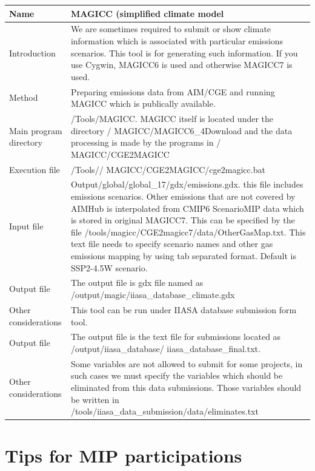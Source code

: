 \documentclass[10pt,a4paper,titlepage,dvipdfmx]{book}
\begin{document}
\begin{itemize}
\begin{tabularx}{\textwidth}{|
p{}|
p{}|} \caption{\label{tab:ReaExaMAGIC}readme example for MAGICC}\\
\hline 
Name & MAGICC (simplified climate model \\\hline 
Introduction & We are sometimes required to submit or show climate information which is associated with particular emissions scenarios. This tool is for generating such information. If you use Cygwin, MAGICC6 is used and otherwise MAGICC7 is used. \\\hline 
Method & Preparing emissions data from AIM/CGE and running MAGICC which is publically available. \\\hline 
Main program directory & /Tools/MAGICC. MAGICC itself is located under the directory / MAGICC/MAGICC6\_4Download and the data processing is made by the programs in / MAGICC/CGE2MAGICC \\\hline 
Execution file & /Tools// MAGICC/CGE2MAGICC/cge2magicc.bat \\\hline 
Input file & Output/global/global\_17/gdx/emissions.gdx. this file includes emissions scenarios. Other emissions that are not covered by AIMHub is interpolated from CMIP6 ScenarioMIP data which is stored in original MAGICC7.
This can be specified by the file /tools/magicc/CGE2magicc7/data/OtherGasMap.txt. This text file needs to specify scenario names and other gas emissions mapping by using tab separated format. 
Default is SSP2-4.5W scenario.\\\hline 
Output file & The output file is gdx file named as /output/magic/iiasa\_database\_climate.gdx \\\hline 
Other considerations & This tool can be run under IIASA database submission form tool. \\\hline 
Output file & The output file is the text file for submissions located as /output/iiasa\_database/ iiasa\_database\_final.txt. \\\hline 
Other considerations & Some variables are not allowed to submit for some projects, in such cases we must specify the variables which should be eliminated from this data submissions. Those variables should be written in /tools/iiasa\_data\_submission/data/eliminates.txt \\\hline 
\end{tabularx}

\chapter{\label{chp:TipsMIP}Tips for MIP participations}


\end{itemize}
\end{document}
